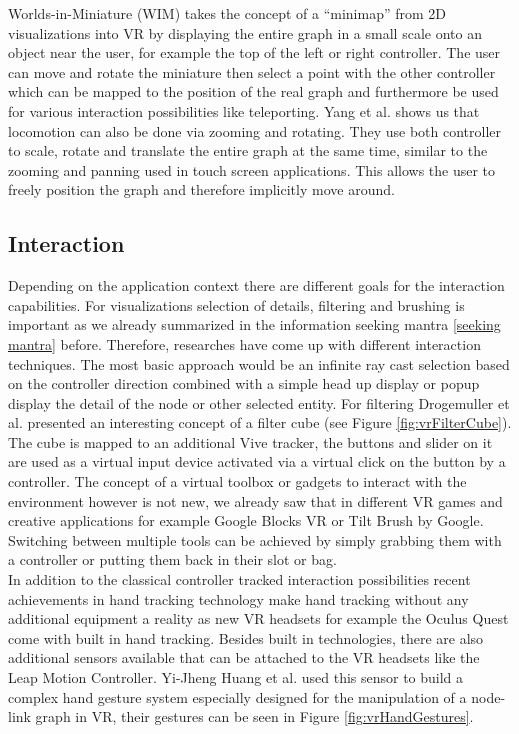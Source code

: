 Worlds-in-Miniature (WIM) \cite{drogemuller_examining_2020} takes the concept of a “minimap” from 2D visualizations into VR by displaying the entire graph in a small scale onto an object near the user, for example the top of the left or right controller. The user can move and rotate the miniature then select a point with the other controller which can be mapped to the position of the real graph and furthermore be used for various interaction possibilities like teleporting. Yang et al. \cite{yang_embodied_2020} shows us that locomotion can also be done via zooming and rotating. They use both controller to scale, rotate and translate the entire graph at the same time, similar to the zooming and panning used in touch screen applications. This allows the user to freely position the graph and therefore implicitly move around.

\subsection{Interaction}

Depending on the application context there are different goals for the interaction capabilities. For visualizations selection of details, filtering and brushing is important as we already summarized in the information seeking mantra \ref{seeking mantra} before. Therefore, researches have come up with different interaction techniques. The most basic approach would be an infinite ray cast selection based on the controller direction combined with a simple head up display or popup display the detail of the node or other selected entity. 
For filtering Drogemuller et al. \cite{drogemuller_vrige_2017} presented an interesting concept of a filter cube (see Figure \ref{fig:vrFilterCube}). The cube is mapped to an additional Vive tracker, the buttons and slider on it are used as a virtual input device activated via a virtual click on the button by a controller. 
The concept of a virtual toolbox or gadgets to interact with the environment however is not new, we already saw that in different VR games and creative applications for example Google Blocks VR or Tilt Brush by Google. Switching between multiple tools can be achieved by simply grabbing them with a controller or putting them back in their slot or bag.\\
In addition to the classical controller tracked interaction possibilities recent achievements in hand tracking technology make hand tracking without any additional equipment a reality as new VR headsets for example the Oculus Quest come with built in hand tracking. Besides built in technologies, there are also additional sensors available that can be attached to the VR headsets like the Leap Motion Controller. Yi-Jheng Huang et al. \cite{yi-jheng_huang_gesture_2017} used this sensor to build a complex hand gesture system especially designed for the manipulation of a node-link graph in VR, their gestures can be seen in Figure \ref{fig:vrHandGestures}. 

